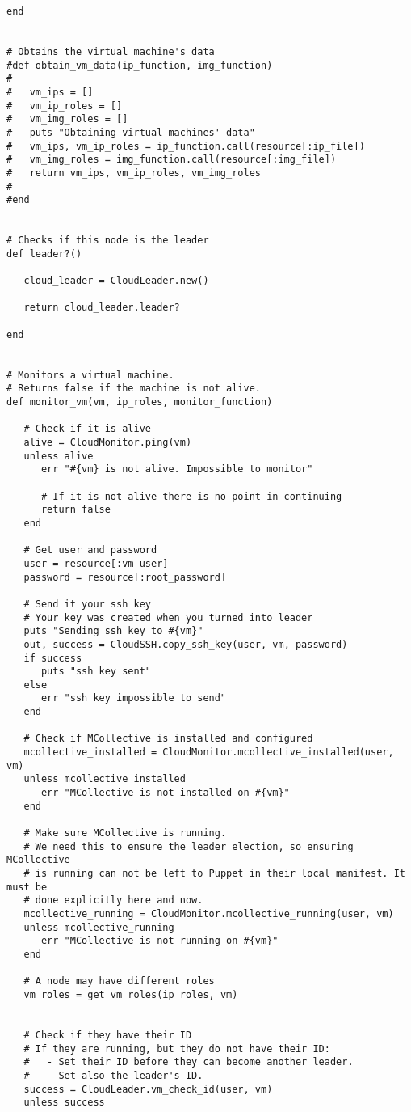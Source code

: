 \begin{lstlisting}
end


# Obtains the virtual machine's data
#def obtain_vm_data(ip_function, img_function)
#   
#   vm_ips = []
#   vm_ip_roles = []
#   vm_img_roles = []
#   puts "Obtaining virtual machines' data"
#   vm_ips, vm_ip_roles = ip_function.call(resource[:ip_file])
#   vm_img_roles = img_function.call(resource[:img_file])
#   return vm_ips, vm_ip_roles, vm_img_roles
#         
#end


# Checks if this node is the leader
def leader?()

   cloud_leader = CloudLeader.new()
 
   return cloud_leader.leader?

end


# Monitors a virtual machine.
# Returns false if the machine is not alive.
def monitor_vm(vm, ip_roles, monitor_function)

   # Check if it is alive
   alive = CloudMonitor.ping(vm)
   unless alive
      err "#{vm} is not alive. Impossible to monitor"
      
      # If it is not alive there is no point in continuing
      return false
   end
   
   # Get user and password
   user = resource[:vm_user]
   password = resource[:root_password]
   
   # Send it your ssh key
   # Your key was created when you turned into leader
   puts "Sending ssh key to #{vm}"
   out, success = CloudSSH.copy_ssh_key(user, vm, password)
   if success
      puts "ssh key sent"
   else
      err "ssh key impossible to send"
   end
   
   # Check if MCollective is installed and configured
   mcollective_installed = CloudMonitor.mcollective_installed(user, vm)
   unless mcollective_installed
      err "MCollective is not installed on #{vm}"
   end
   
   # Make sure MCollective is running.
   # We need this to ensure the leader election, so ensuring MCollective
   # is running can not be left to Puppet in their local manifest. It must be
   # done explicitly here and now.
   mcollective_running = CloudMonitor.mcollective_running(user, vm)
   unless mcollective_running
      err "MCollective is not running on #{vm}"
   end
   
   # A node may have different roles
   vm_roles = get_vm_roles(ip_roles, vm)
   
   
   # Check if they have their ID
   # If they are running, but they do not have their ID:
   #   - Set their ID before they can become another leader.
   #   - Set also the leader's ID.
   success = CloudLeader.vm_check_id(user, vm)
   unless success
   

\end{lstlisting}
